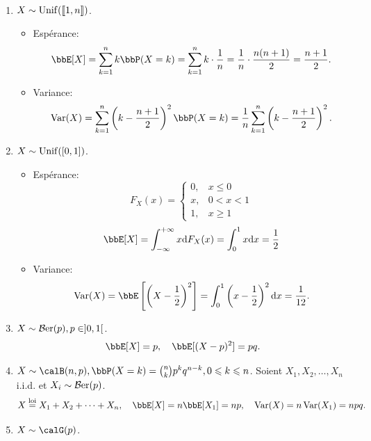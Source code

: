 \begin{exem}
    $\ $
    \begin{enumerate}
        \item $X \sim \operatorname{Unif}(\llbracket 1, n \rrbracket)$.
              \begin{itemize}
                  \item Espérance:
                        \[ \bbE[X] = \sum_{k = 1}^n k \bbP(X = k) = \sum_{k = 1}^n k \cdot \frac{1}{n}
                            = \frac{1}{n} \cdot \frac{n(n + 1)}{2} = \frac{n + 1}{2}. \]
                  \item Variance:
                        \[ \var(X) = \sum_{k = 1}^n \left(k - \frac{n + 1}{2}\right)^2 \bbP(X = k)
                            = \frac{1}{n} \sum_{k = 1}^n \left(k - \frac{n + 1}{2}\right)^2. \]
              \end{itemize}
        \item $X \sim \operatorname{Unif}([0, 1])$.
              \begin{itemize}
                  \item Espérance:
                        \[ F_X(x) =
                            \begin{cases}
                                0, & x \leqslant 0 \\
                                x, & 0 < x < 1     \\
                                1, & x \geqslant 1
                            \end{cases}
                        \]
                        \[ \bbE[X] = \int_{-\infty}^{+\infty} x \dif F_X(x) = \int_0^1 x \dif x = \frac{1}{2} \]
                  \item Variance:
                        \[ \var(X) = \bbE\left[\left(X - \frac{1}{2}\right)^2\right] = \int_0^1 \left(x - \frac{1}{2}\right)^2 \dif x = \frac{1}{12}. \]
              \end{itemize}
        \item $X \sim \operatorname{\mathcal{B}er}(p), p \in ]0, 1[$.
              \[ \bbE[X] = p, \quad \bbE[(X - p)^2] = pq. \]
        \item $X \sim \calB(n, p), \bbP(X = k) = \binom{n}{k} p^k q^{n - k}, 0 \leqslant k \leqslant n$.
              Soient $X_1, X_2, \ldots, X_n$ i.i.d. et $X_i \sim \operatorname{\mathcal{B}er}(p)$.
              \[ X \overset{\text{loi}}{=} X_1 + X_2 + \cdots + X_n, \quad
                  \bbE[X] = n \bbE[X_1] = np, \quad
                  \var(X) = n \var(X_1) = npq. \]
        \item $X \sim \calG(p)$.
              \begin{align*}

\end{align*}
\end{enumerate}
\end{exem}
